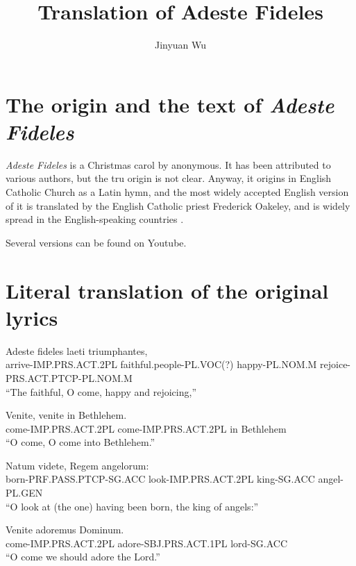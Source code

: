 \documentclass[a4paper]{article}
\title{Translation of Adeste Fideles}
\author{Jinyuan Wu}
\begin{document}
\maketitle

\section{The origin and the text of \emph{Adeste Fideles}}

\emph{Adeste Fideles} is a Christmas carol by anonymous. 
It has been attributed to various authors, but the tru origin is not clear. 
Anyway, it origins in English Catholic Church as a Latin hymn, 
and the most widely accepted English version of it is translated by the English Catholic priest Frederick Oakeley,
and is widely spread in the English-speaking countries \cite{wiki}.

Several versions can be found on Youtube. 

\section{Literal translation of the original lyrics}

\begin{exe}
    
\sn 
\gll Adeste                  fideles                    laeti           triumphantes, \\
     arrive-IMP.PRS.ACT.2PL  faithful.people-PL.VOC(?)  happy-PL.NOM.M  rejoice-PRS.ACT.PTCP-PL.NOM.M \\ 
\glt ``The faithful, O come, happy and rejoicing,''

\sn
\gll Venite,              venite                in Bethlehem. \\
     come-IMP.PRS.ACT.2PL  come-IMP.PRS.ACT.2PL in Bethlehem \\
\glt ``O come, O come into Bethlehem.''

\sn
\gll Natum                     videte,              Regem         angelorum: \\
    born-PRF.PASS.PTCP-SG.ACC  look-IMP.PRS.ACT.2PL king-SG.ACC   angel-PL.GEN  \\
\glt ``O look at (the one) having been born, the king of angels:''

\sn
\gll Venite                adoremus               Dominum. \\
     come-IMP.PRS.ACT.2PL  adore-SBJ.PRS.ACT.1PL  lord-SG.ACC \\
\glt ``O come we should adore the Lord.''

\end{exe}
\end{document}
